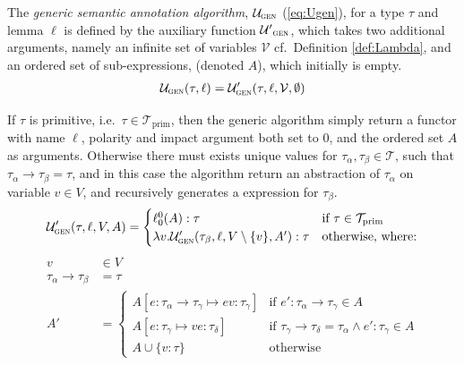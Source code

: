 \begin{definition}
	The \emph{generic semantic annotation algorithm}, $\mathcal{U}_\textsc{gen}$ (\ref{eq:Ugen}), for a type $\tau$ and lemma $\ell$ is defined by the auxiliary function $\mathcal{U'}_\textsc{gen}$, which takes two additional arguments, namely an infinite set of variables $\mathcal{V}$ cf.\ Definition \ref{def:Lambda}, and an ordered set of sub-expressions, (denoted $A$), which initially is empty.
\begin{align}
	\mathcal{U}_\textsc{gen}(\tau, \ell) = \mathcal{U}'_\textsc{gen}(\tau, \ell, \mathcal{V}, \emptyset)
	\label{eq:Ugen}
\end{align}

If $\tau$ is primitive, i.e.\ $\tau \in \mathcal{T}_\mathrm{prim}$, then the generic algorithm simply return a functor with name $\ell$, polarity and impact argument both set to $0$, and the ordered set $A$ as arguments. Otherwise there must exists unique values for $\tau_\alpha, \tau_\beta \in \mathcal{T}$, such that $\tau_\alpha \to \tau_\beta = \tau$, and in this case the algorithm return an abstraction of $\tau_\alpha$ on variable $v \in V$, and recursively generates a expression for $\tau_\beta$.
\begin{align*}
	\mathcal{U}'_\textsc{gen}(\tau, \ell,V,A) =
	\begin{cases}
	 \ell_0^0(A) : \tau	&\text{if $\tau \in \mathcal{T}_\mathrm{prim}$} \\	
	 \lambda v . \mathcal{U}'_\textsc{gen}(\tau_\beta, \ell, V \setminus \{v \}, A') : \tau
	&\text{otherwise, where:} %
	\end{cases}
\end{align*}
\begin{align*}
	v &\in V\\
	\tau_\alpha \to \tau_\beta &= \tau\\
	A' &=
	\begin{cases}
    A [e : \tau_\alpha \to \tau_\gamma \mapsto e v : \tau_\gamma ] & \text{if $e' : \tau_\alpha \to \tau_\gamma \in A$} \\ %
    A [e : \tau_\gamma \mapsto v e : \tau_\delta ] & \text{if $\tau_\gamma \to \tau_\delta = \tau_\alpha \wedge e' : \tau_\gamma \in A$}\\
    A \cup \{v : \tau\} & \text{otherwise}
	\end{cases}
\end{align*}

\end{definition}
